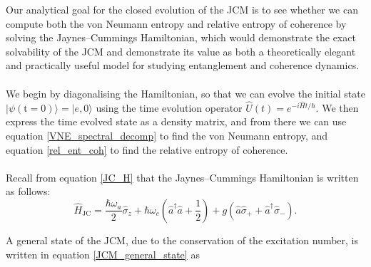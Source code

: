 \documentclass[12pt]{article}
\begin{document}
Our analytical goal for the closed evolution of the JCM is to see whether we can compute both the von Neumann entropy and relative entropy of coherence by solving the Jaynes--Cummings Hamiltonian, which would demonstrate the exact solvability of the JCM and demonstrate its value as both a theoretically elegant and practically useful model for studying entanglement and coherence dynamics.\\
\\
We begin by diagonalising the Hamiltonian, so that we can evolve the initial state $|\psi (\text{t}=0)\rangle = |e, 0\rangle$ using the time evolution operator $\hat{U}(t) = e^{-i\hat{H}t/\hbar}$. We then express the time evolved state as a density matrix, and from there we can use equation \eqref{VNE_spectral_decomp} to find the von Neumann entropy, and equation \eqref{rel_ent_coh} to find the relative entropy of coherence.\\
\\
Recall from equation \eqref{JC_H} that the Jaynes--Cummings Hamiltonian is written as follows:
\begin{equation*}
        \hat{H}_{\scriptscriptstyle \text{JC}} = \frac{\hbar\omega_a}{2}\hat{\sigma}_z + \hbar\omega_c\left(\hat{a}^\dagger \hat{a} + \frac{1}{2} \right) + g(\hat{a}\hat{\sigma}_{+} + \hat{a}^\dagger\hat{\sigma}_{-}).
\end{equation*}

A general state of the JCM, due  to the conservation of the excitation number, is written in equation \eqref{JCM_general_state} as
\end{document}
